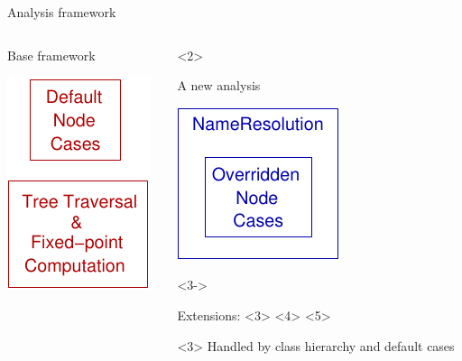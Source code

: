 \begin{frame}[t]{Analysis framework}
  \begin{columns}[T]
    \begin{column}{4cm}
      \begin{block}{Base framework}
        \begin{center}
          \includegraphics{images/analysis_left.pdf}
        \end{center}
      \end{block}
    \end{column}
    \begin{column}{6cm}
      \begin{onlyenv}<2>
        \begin{block}{A new analysis}
          \begin{center}
            \includegraphics{images/analysis_right.pdf}
          \end{center}
        \end{block}
      \end{onlyenv}
      \begin{onlyenv}<3->
        \begin{block}{Extensions: 
            <3>
            <4>
            <5>
          }
          \begin{center}
            \begin{onlyenv}<3>
              Handled by class hierarchy and default cases

\end{onlyenv}
\end{center}
\end{block}
\end{onlyenv}
\end{column}
\end{columns}
\end{frame}
